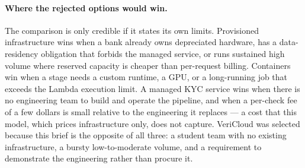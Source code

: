 \paragraph{Where the rejected options would win.}
The comparison is only credible if it states its own limits. Provisioned
infrastructure wins when a bank already owns depreciated hardware, has a
data-residency obligation that forbids the managed service, or runs sustained
high volume where reserved capacity is cheaper than per-request billing.
Containers win when a stage needs a custom runtime, a GPU, or a long-running job
that exceeds the Lambda execution limit. A managed KYC service wins when there
is no engineering team to build and operate the pipeline, and when a per-check
fee of a few dollars is small relative to the engineering it replaces --- a cost
that this model, which prices infrastructure only, does not capture. VeriCloud
was selected because this brief is the opposite of all three: a student team with
no existing infrastructure, a bursty low-to-moderate volume, and a requirement to
demonstrate the engineering rather than procure it.
